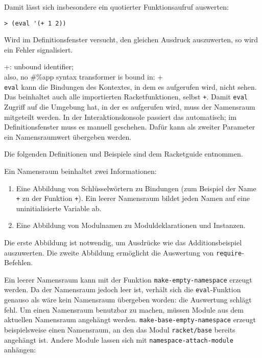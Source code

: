 Damit lässt sich insbesondere ein quotierter Funktionsaufruf auswerten:

\begin{lstlisting}
> (eval '(+ 1 2))
\end{lstlisting}
{}

Wird im Definitionsfenster versucht, den gleichen Ausdruck auszuwerten, so wird ein Fehler signalisiert.

{\color{red}\ttfamily\small\hspace{5pt} +: unbound identifier;}\\
{\color{red}\ttfamily\small\hspace{5pt} also, no \#\%app syntax transformer is bound in: +}\\

\texttt{eval} kann die Bindungen des Kontextes, in dem es aufgerufen wird, nicht sehen. Das beinhaltet auch alle importierten Racketfunktionen, selbst \texttt{+}. Damit \texttt{eval} Zugriff auf die Umgebung hat, in der es aufgerufen wird, muss der Namensraum mitgeteilt werden. In der Interaktionskonsole passiert das automatisch; im Definitionsfenster muss es manuell geschehen. Dafür kann als zweiter Parameter ein Namensraumwert übergeben werden. 

Die folgenden Definitionen und Beispiele sind dem Racketguide \cite{racketguide-namespace} entnommen.

Ein Namensraum beinhaltet zwei Informationen:
\begin{enumerate}
 \item Eine Abbildung von Schlüsselwörtern zu Bindungen (zum Beispiel der Name \texttt{+} zu der Funktion \texttt{+}). Ein leerer Namensraum bildet jeden Namen auf eine uninitialisierte Variable ab.
 \item Eine Abbildung von Modulnamen zu Moduldeklarationen und Instanzen.
\end{enumerate}

Die erste Abbildung ist notwendig, um Ausdrücke wie das Additionsbeispiel auszuwerten. Die zweite Abbildung ermöglicht die Auswertung von \texttt{require}-Befehlen.

Ein leerer Namensraum kann mit der Funktion \texttt{make-empty-namespace} erzeugt werden. Da der Namensraum jedoch leer ist, verhält sich die \texttt{eval}-Funktion genauso als wäre kein Namensraum übergeben worden: die Auswertung schlägt fehl. Um einen Namensraum benutzbar zu machen, müssen Module aus dem aktuellen Namensraum angehängt werden. \texttt{make-base-empty-namespace} erzeugt beispielsweise einen Namensraum, an den das Modul \texttt{racket/base} bereits angehängt ist. Andere Module lassen sich mit \texttt{namespace-attach-module} anhängen:

